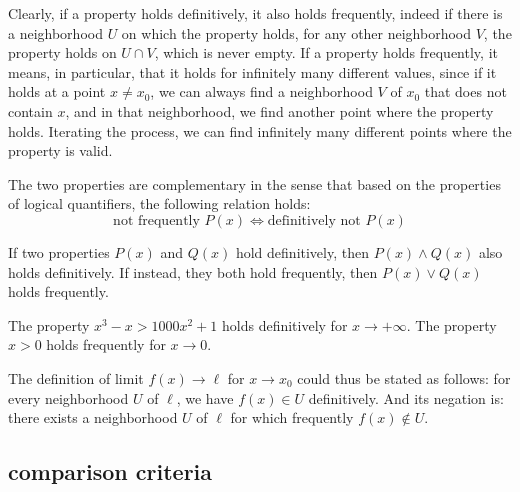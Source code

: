 Clearly, if a property holds definitively, it also holds frequently,
indeed if there is a neighborhood $U$ on which the property holds, for any other
neighborhood
$V$, the property holds on $U\cap V$, which is never empty.
If a property holds frequently, it means, in particular, that it holds for 
infinitely many different values, since if it holds at a point $x\neq x_0$, 
we can always find a neighborhood $V$ of $x_0$ that does not contain $x$,
and in that neighborhood, we find another point where the property holds. 
Iterating the process, we can find infinitely many different points where 
the property is valid.

The two properties are complementary in the sense that
based on the properties of logical quantifiers, the following relation holds:
\[
  \text{not frequently $P(x)$} \iff
  \text{definitively not $P(x)$}
\]

If two properties $P(x)$ and $Q(x)$ hold definitively, then
$P(x)\land Q(x)$ also holds definitively. If instead, they both
hold frequently, then $P(x) \lor Q(x)$ holds frequently.

\begin{example}
The property $x^3 - x > 1000 x^2 + 1$
holds definitively for $x\to +\infty$.
The property $x>0$ holds frequently for $x\to 0$.
\end{example}


The definition of limit $f(x) \to \ell$ for $x\to x_0$ 
could thus be stated as follows:
for every neighborhood $U$ of $\ell$, we have $f(x)\in U$ definitively.
And its negation is: there exists a neighborhood $U$ of $\ell$ for which
frequently $f(x)\not\in U$.


\subsection{comparison criteria}

